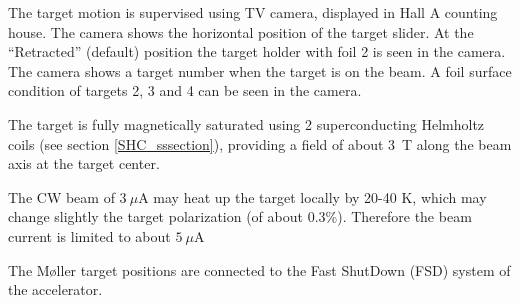 {\begin{safetyen}{0}{0}
The target motion is supervised using TV camera, displayed in
Hall A counting house. The camera shows the horizontal position of the 
target slider. At the ``Retracted'' (default) position the target holder 
with foil 2 is seen in the camera. The camera shows a target number when the target 
is on the beam. A foil surface condition of targets 2, 3 and 4 can be seen in 
the camera.

The target is fully magnetically saturated using 2 superconducting 
Helmholtz coils (see section \ref{SHC_sssection}), providing a field of about 3~T
along the beam axis at the target center. 

The CW beam of $3~\mu$A may heat up the target locally by 20-40 K,
which may change slightly the target polarization (of about 0.3\%). Therefore
the beam current is limited to about $5~\mu$A

\end{safetyen}


\noindent
    The M{\o}ller target positions are connected to the Fast ShutDown (FSD)
    system of the accelerator.
} %



